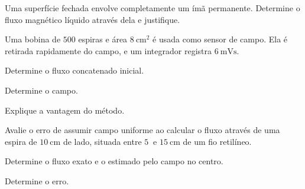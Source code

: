 \begin{questao}[3]{}

Uma superfície fechada envolve completamente um ímã permanente. Determine o
fluxo magnético líquido através dela e justifique.


\end{questao}
\begin{questao}[3]{}

Uma bobina de $500$ espiras e área $\SI{8}{\centi\meter\squared}$ é usada como
sensor de campo. Ela é retirada rapidamente do campo, e um integrador registra
$\SI{6}{\milli\volt\second}$.
\begin{itensq}
\item Determine o fluxo concatenado inicial.
\item Determine o campo.
\item Explique a vantagem do método.
\end{itensq}


\end{questao}
\begin{questao}[3]{}

Avalie o erro de assumir campo uniforme ao calcular o fluxo através de uma
espira de $\SI{10}{\centi\meter}$ de lado, situada entre $\SI{5}{}$ e
$\SI{15}{\centi\meter}$ de um fio retilíneo.
\begin{itensq}
\item Determine o fluxo exato e o estimado pelo campo no centro.
\item Determine o erro.
\end{itensq}


\end{questao}

